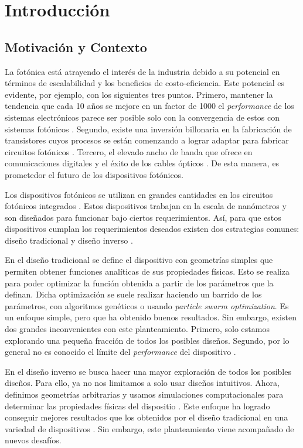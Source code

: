 \chapter{Introducción}

\section{Motivación y Contexto}

La fotónica está atrayendo el interés de la industria debido a su potencial en términos de escalabilidad y los beneficios de costo-eficiencia. 
Este potencial es evidente, por ejemplo, con los siguientes tres puntos. 
Primero, mantener la tendencia que cada 10 años se mejore en un factor de 1000 el \emph{performance} de los sistemas electrónicos parece ser posible solo con la convergencia de estos con sistemas fotónicos \cite{Glick2018}. 
Segundo, existe una inversión billonaria en la fabricación de transistores cuyos procesos se están comenzando a lograr adaptar para fabricar circuitos fotónicos \cite{LukasChrostowski2010}.
Tercero, el elevado ancho de banda que ofrece en comunicaciones digitales y el éxito de los cables ópticos \cite{LukasChrostowski2010, Glick2018}.
De esta manera, es prometedor el futuro de los dispositivos fotónicos.

Los dispositivos fotónicos se utilizan en grandes cantidades en los circuitos fotónicos integrados \cite{LukasChrostowski2010}. 
Estos dispositivos trabajan en la escala de nanómetros y son diseñados para funcionar bajo ciertos requerimientos. 
Así, para que estos dispositivos cumplan los requerimientos deseados existen dos estrategias comunes: diseño tradicional y diseño inverso \cite{Molesky2018}.


En el diseño tradicional se define el dispositivo con geometrías simples que permiten obtener funciones analíticas de sus propiedades físicas. 
Esto se realiza para poder optimizar la función obtenida a partir de los parámetros que la definan. Dicha optimización se suele realizar haciendo
un barrido de los parámetros, con algoritmos genéticos o usando \emph{particle swarm optimization}. Es un enfoque simple, pero que ha obtenido
buenos resultados. Sin embargo, existen dos grandes inconvenientes con este planteamiento. 
Primero, solo estamos explorando una pequeña fracción de todos los posibles diseños.
Segundo, por lo general no es conocido el límite del \emph{performance} del dispositivo \cite{Molesky2018, Su2020}.


En el diseño inverso se busca hacer una mayor exploración de todos los posibles diseños. 
Para ello, ya no nos limitamos a solo usar diseños intuitivos. Ahora, definimos geometrías arbitrarias y usamos simulaciones computacionales para determinar las propiedades físicas del dispositio \cite{Molesky2018, Su2020}. Este enfoque ha logrado conseguir mejores resultados que los obtenidos por el diseño tradicional en una variedad de dispositivos \cite{Su2018, Molesky2018}. Sin embargo, este planteamiento viene acompañado de nuevos desafíos.


